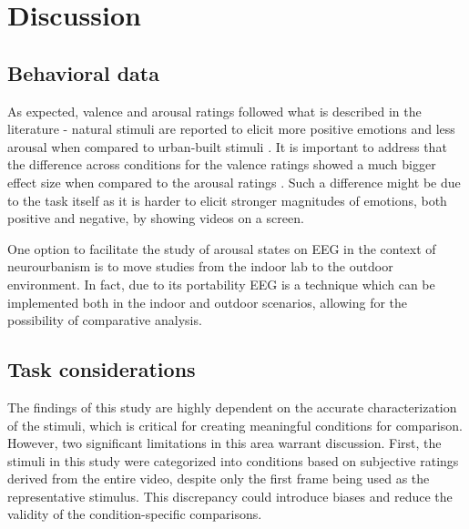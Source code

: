 
\chapter{Discussion}
\label{chapter:discussions}

\section{Behavioral data}

As expected, valence and arousal ratings followed what is described in the literature - natural stimuli are reported to elicit more positive  emotions and less arousal when compared to urban-built stimuli \cite{mahamaneNaturalCategorizationElectrophysiological2020, mavrosMobileEEGStudy2022, mavrosAttenuatingSubjectiveCrowding2023}. It is important to address that the difference across conditions for the valence ratings showed  a much bigger effect size when compared to the arousal ratings \cite{sawilowskyNewEffectSize2009}. Such a difference might be due to the task itself as it is harder to elicit stronger magnitudes of emotions, both positive and negative, by showing videos on a screen. 

One option to facilitate the study of arousal states on EEG in the context of neurourbanism is to move studies from the indoor lab to the outdoor environment. In fact, due to its portability EEG is a technique which can be implemented both in the indoor and outdoor scenarios, allowing for the possibility of comparative analysis.

\section{Task considerations}

The findings of this study are highly dependent on the accurate characterization of the stimuli, which is critical for creating meaningful conditions for comparison. However, two significant limitations in this area warrant discussion. First, the stimuli in this study were categorized into conditions based on subjective ratings derived from the entire video, despite only the first frame being used as the representative stimulus. This discrepancy could introduce biases and reduce the validity of the condition-specific comparisons.

